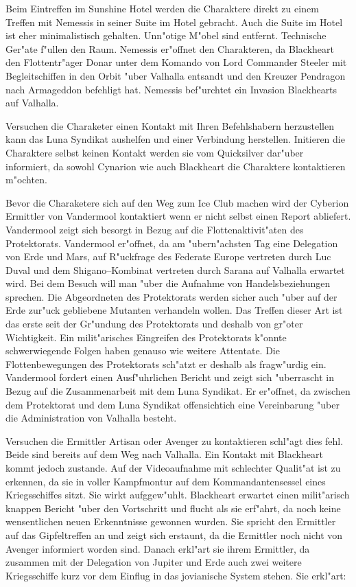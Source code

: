 Beim Eintreffen im Sunshine Hotel werden die Charaktere direkt zu einem Treffen mit Nemessis in seiner Suite im Hotel gebracht. Auch die Suite im Hotel ist eher minimalistisch gehalten. Unn"otige M"obel sind entfernt. Technische Ger"ate f"ullen den Raum. Nemessis er"offnet den Charakteren, da\3 Blackheart den Flottentr"ager Donar unter dem Komando von Lord Commander Steeler mit Begleitschiffen in den Orbit "uber Valhalla entsandt und den Kreuzer Pendragon nach Armageddon befehligt hat. Nemessis bef"urchtet ein Invasion Blackhearts auf Valhalla.

Versuchen die Charaketer einen Kontakt mit Ihren Befehlshabern herzustellen kann das Luna Syndikat aushelfen und einer Verbindung herstellen. Initieren die Charaktere selbst keinen Kontakt werden sie vom Quicksilver dar"uber informiert, da\3 sowohl Cynarion wie auch Blackheart die Charaktere kontaktieren m"ochten.

Bevor die Charaketere sich auf den Weg zum Ice Club machen wird der Cyberion Ermittler von Vandermool kontaktiert wenn er nicht selbst einen Report abliefert. Vandermool zeigt sich besorgt in Bezug auf die Flottenaktivit"aten des Protektorats. Vandermool er"offnet, da\3 am "ubern"achsten Tag eine Delegation von Erde und Mars, auf R"uckfrage des Federate Europe vertreten durch Luc Duval und dem Shigano--Kombinat vertreten durch Sarana auf Valhalla erwartet wird. Bei dem Besuch will man "uber die Aufnahme von Handelsbeziehungen sprechen. Die Abgeordneten des Protektorats werden sicher auch "uber auf der Erde zur"uck gebliebene Mutanten verhandeln wollen. Das Treffen dieser Art ist das erste seit der Gr"undung des Protektorats und deshalb von gr"o\3ter Wichtigkeit. Ein milit"arisches Eingreifen des Protektorats k"onnte schwerwiegende Folgen haben genauso wie weitere Attentate. Die Flottenbewegungen des Protektorats sch"atzt er deshalb als fragw"urdig ein. Vandermool fordert einen Ausf"uhrlichen Bericht und zeigt sich "uberrascht in Bezug auf die Zusammenarbeit mit dem Luna Syndikat. Er er"offnet, da\3 zwischen dem Protektorat und dem Luna Syndikat offensichtich eine Vereinbarung "uber die Administration von Valhalla besteht.

Versuchen die Ermittler Artisan oder Avenger zu kontaktieren schl"agt dies fehl. Beide sind bereits auf dem Weg nach Valhalla. Ein Kontakt mit Blackheart kommt jedoch zustande. Auf der Videoaufnahme mit schlechter Qualit"at ist zu erkennen, da\3 sie in voller Kampfmontur auf dem Kommandantensessel eines Kriegsschiffes sitzt. Sie wirkt aufggew"uhlt. Blackheart erwartet einen milit"arisch knappen Bericht "uber den Vortschritt und flucht als sie erf"ahrt, da\3 noch keine wensentlichen neuen Erkenntnisse gewonnen wurden. Sie spricht den Ermittler auf das Gipfeltreffen an und zeigt sich erstaunt, da\3 die Ermittler noch nicht von Avenger informiert worden sind. Danach erkl"art sie ihrem Ermittler, da\3 zusammen mit der Delegation von Jupiter und Erde auch zwei weitere Kriegsschiffe kurz vor dem Einflug in das jovianische System stehen. Sie erkl"art:

